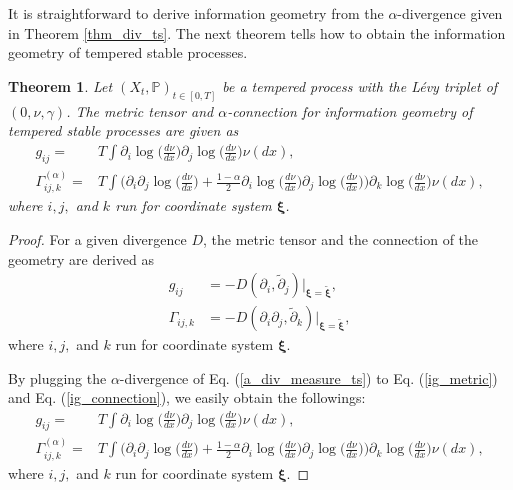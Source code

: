 \documentclass[preprint,11pt]{amsart}
\newtheorem{thm}{Theorem}
\begin{document}
	It is straightforward to derive information geometry from the $\alpha$-divergence given in Theorem \ref{thm_div_ts}. The next theorem tells how to obtain the information geometry of tempered stable processes.
	\begin{thm}
	\label{thm_geo_ts}
	Let $(X_t, \mathbb{P})_{t\in[0,T]}$ be a tempered process with the L\'evy triplet of $(0,\nu,\gamma)$. The metric tensor and $\alpha$-connection for information geometry of tempered stable processes are given as
	\begin{align}
		\label{metric_ts}
		g_{ij}=&T\int \partial_i \log{\Big(\frac{d\nu}{dx}\Big)} \partial_j \log{\Big(\frac{d\nu}{dx}\Big)} \nu(dx),\\
		\label{conn_ts}
		\Gamma^{(\alpha)}_{ij,k}=&T\int \Big(\partial_i \partial_j \log{\Big(\frac{d\nu}{dx}\Big)}+\frac{1-\alpha}{2}\partial_i \log{\Big(\frac{d\nu}{dx}\Big)} \partial_j \log{\Big(\frac{d\nu}{dx}\Big)}\Big)\partial_k \log{\Big(\frac{d\nu}{dx}\Big)} \nu(dx),
	\end{align}
	where $i,j,$ and $k$ run for coordinate system $\boldsymbol{\xi}$.
	\end{thm}
	\begin{proof}
	For a given divergence $D$, the metric tensor and the connection of the geometry are derived \cite{amari2000methods} as
	\begin{align}
		\label{ig_metric}
		g_{ij}&=-D(\partial_i, \tilde{\partial}_j)|_{\boldsymbol{\xi}=\tilde{\boldsymbol{\xi}}},\\
		\label{ig_connection}
		\Gamma_{ij,k}&=-D(\partial_i \partial_j,\tilde{\partial}_k)|_{\boldsymbol{\xi}=\tilde{\boldsymbol{\xi}}},
	\end{align}
	where $i,j,$ and $k$ run for coordinate system $\boldsymbol{\xi}$.
	
	By plugging the $\alpha$-divergence of Eq. (\ref{a_div_measure_ts}) to Eq. (\ref{ig_metric}) and Eq. (\ref{ig_connection}), we easily obtain the followings:
	\begin{align}
		g_{ij}=&T\int \partial_i \log{\Big(\frac{d\nu}{dx}\Big)} \partial_j \log{\Big(\frac{d\nu}{dx}\Big)} \nu(dx),\nonumber\\
		\Gamma^{(\alpha)}_{ij,k}=&T\int \Big(\partial_i \partial_j \log{\Big(\frac{d\nu}{dx}\Big)}+\frac{1-\alpha}{2}\partial_i \log{\Big(\frac{d\nu}{dx}\Big)} \partial_j \log{\Big(\frac{d\nu}{dx}\Big)}\Big)\partial_k \log{\Big(\frac{d\nu}{dx}\Big)} \nu(dx),\nonumber
	\end{align}
	where $i,j,$ and $k$ run for coordinate system $\boldsymbol{\xi}$.
	\end{proof}
	
\end{document}
